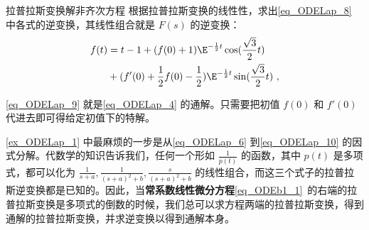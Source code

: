\begin{example}{拉普拉斯变换解非齐次方程}
根据拉普拉斯变换的线性性，求出\autoref{eq_ODELap_8} 中各式的逆变换，其线性组合就是 $F(s)$ 的逆变换：
\begin{equation}\label{eq_ODELap_9}
\begin{aligned}
f(t)&=t-1+(f(0)+1)\E^{-\frac{1}{2}t}\cos(\frac{\sqrt{3}}{2}t)\\&
+(f'(0)+\frac{1}{2}f(0)-\frac{1}{2})\E^{-\frac{1}{2}t}\sin(\frac{\sqrt{3}}{2}t)~,
\end{aligned}
\end{equation}

\autoref{eq_ODELap_9} 就是\autoref{eq_ODELap_4} 的通解。只需要把初值 $f(0)$ 和 $f'(0)$ 代进去即可得给定初值下的特解。




\end{example}

\autoref{ex_ODELap_1} 中最麻烦的一步是从\autoref{eq_ODELap_6} 到\autoref{eq_ODELap_10} 的因式分解。代数学的知识告诉我们，任何一个形如 $\frac{1}{p(t)}$ 的函数，其中 $p(t)$ 是多项式，都可以化为 $\frac{1}{s+a}, \frac{1}{(s+a)^2+b}, \frac{s}{(s+a)^2+b}$ 的线性组合，而这三个式子的拉普拉斯逆变换都是已知的。因此，当\textbf{常系数线性微分方程}\autoref{eq_ODEb1_1}~的右端的拉普拉斯变换是多项式的倒数的时候，我们总可以求方程两端的拉普拉斯变换，得到通解的拉普拉斯变换，并求逆变换以得到通解本身。
















